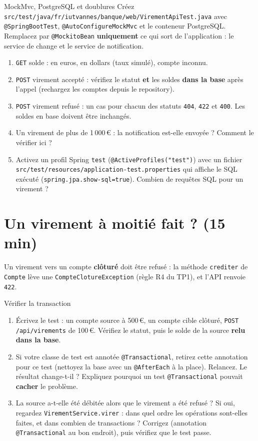 \documentclass[11pt]{article}
\begin{document}
\begin{exobox}{MockMvc, PostgreSQL et doublures}
Créez \texttt{src/test/java/fr/iutvannes/banque/web/VirementApiTest.java} avec \texttt{@SpringBootTest}, \texttt{@AutoConfigureMockMvc} et le conteneur PostgreSQL. Remplacez par \texttt{@MockitoBean} \textbf{uniquement} ce qui sort de l'application : le service de change et le service de notification.
\begin{enumerate}[leftmargin=1.4em]
  \item \texttt{GET} solde : en euros, en dollars (taux simulé), compte inconnu.
  \item \texttt{POST} virement accepté : vérifiez le statut \textbf{et} les soldes \textbf{dans la base} après l'appel (rechargez les comptes depuis le repository).
  \item \texttt{POST} virement refusé : un cas pour chacun des statuts \texttt{404}, \texttt{422} et \texttt{400}. Les soldes en base doivent être inchangés.
  \item Un virement de plus de 1\,000\,\euro{} : la notification est-elle envoyée ? Comment le vérifier ici ?
  \item Activez un profil Spring \texttt{test} (\texttt{@ActiveProfiles("test")}) avec un fichier \texttt{src/test/resources/application-test.properties} qui affiche le SQL exécuté (\texttt{spring.jpa.show-sql=true}). Combien de requêtes SQL pour un virement ?
\end{enumerate}
\end{exobox}

\section{Un virement à moitié fait ? (15 min)}

Un virement vers un compte \textbf{clôturé} doit être refusé : la méthode \texttt{crediter} de \texttt{Compte} lève une \texttt{CompteClotureException} (règle R4 du TP1), et l'API renvoie \texttt{422}.

\begin{exobox}{Vérifier la transaction}
\begin{enumerate}[leftmargin=1.4em]
  \item Écrivez le test : un compte source à 500\,\euro{}, un compte cible clôturé, \texttt{POST /api/virements} de 100\,\euro{}. Vérifiez le statut, puis le solde de la source \textbf{relu dans la base}.
  \item Si votre classe de test est annotée \texttt{@Transactional}, retirez cette annotation pour ce test (nettoyez la base avec un \texttt{@AfterEach} à la place). Relancez. Le résultat change-t-il ? Expliquez pourquoi un test \texttt{@Transactional} pouvait \textbf{cacher} le problème.
  \item La source a-t-elle été débitée alors que le virement a été refusé ? Si oui, regardez \texttt{VirementService.virer} : dans quel ordre les opérations sont-elles faites, et dans combien de transactions ? Corrigez (annotation \texttt{@Transactional} au bon endroit), puis vérifiez que le test passe.
\end{enumerate}
\end{exobox}
\end{document}
